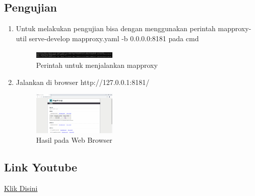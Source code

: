 \subsection{Pengujian}
\begin{enumerate}
    \item Untuk melakukan pengujian bisa dengan menggunakan perintah mapproxy-util serve-develop mapproxy.yaml -b 0.0.0.0:8181 pada cmd
    \hfill\break
    \begin{figure}[H]
		\includegraphics[width=4cm]{figures/1174008/5/6.png}
		\centering
		\caption{Perintah untuk menjalankan mapproxy}
    \end{figure}

    \item Jalankan di browser http://127.0.0.1:8181/
    \hfill\break
    \begin{figure}[H]
		\includegraphics[width=4cm]{figures/1174008/5/7.png}
		\centering
		\caption{Hasil pada Web Browser}
    \end{figure}

\end{enumerate}

\subsection{Link Youtube}
\href{https://www.youtube.com/watch?v=VoWTSqLcKVg&feature=youtu.be}{Klik Disini}